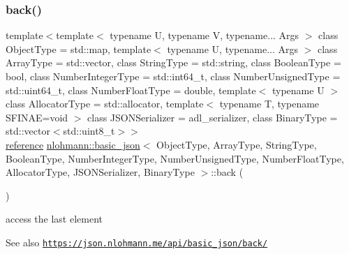 \subsubsection{\texorpdfstring{back()}{back()}\hspace{0.1cm}{\footnotesize\ttfamily [1/2]}}
{\footnotesize\ttfamily template$<$template$<$ typename U, typename V, typename... Args $>$ class Object\+Type = std\+::map, template$<$ typename U, typename... Args $>$ class Array\+Type = std\+::vector, class String\+Type  = std\+::string, class Boolean\+Type  = bool, class Number\+Integer\+Type  = std\+::int64\+\_\+t, class Number\+Unsigned\+Type  = std\+::uint64\+\_\+t, class Number\+Float\+Type  = double, template$<$ typename U $>$ class Allocator\+Type = std\+::allocator, template$<$ typename T, typename S\+F\+I\+N\+A\+E=void $>$ class J\+S\+O\+N\+Serializer = adl\+\_\+serializer, class Binary\+Type  = std\+::vector$<$std\+::uint8\+\_\+t$>$$>$ \\
\hyperlink{classnlohmann_1_1basic__json_a220ae98554a76205fb7f8822d36b2d5a}{reference} \hyperlink{classnlohmann_1_1basic__json}{nlohmann\+::basic\+\_\+json}$<$ Object\+Type, Array\+Type, String\+Type, Boolean\+Type, Number\+Integer\+Type, Number\+Unsigned\+Type, Number\+Float\+Type, Allocator\+Type, J\+S\+O\+N\+Serializer, Binary\+Type $>$\+::back (\begin{DoxyParamCaption}{ }\end{DoxyParamCaption})\hspace{0.3cm}{\ttfamily [inline]}}



access the last element 

\begin{DoxySeeAlso}{See also}
\href{https://json.nlohmann.me/api/basic_json/back/}{\tt https\+://json.\+nlohmann.\+me/api/basic\+\_\+json/back/} 
\end{DoxySeeAlso}
\mbox{\label{classnlohmann_1_1basic__json_aac965b84ea43ccd8aef9caefef02794a}} 
